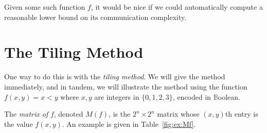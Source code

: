 \documentclass[12pt]{article}
\begin{document}
Given some such function $f$, it would be nice if we could automatically compute
a reasonable lower bound on its communication complexity.

\section{The Tiling Method}

One way to do this is with the \emph{tiling method}.
We will give the method immediately, and in tandem, we will illustrate the method using
the function $f(x, y) = x < y$ where $x, y$ are integers in $\{ 0, 1, 2, 3 \}$, encoded in $\mathbb{B}$oolean.

\begin{definition}[$M(f)$]
The \emph{matrix of }$f$,
	denoted $M(f)$,
		is the $2^n \times 2^n$ matrix whose $(x, y)$th entry
		is the value $f(x, y)$.
An example is given in Table~\ref{fig:ex:Mf}.
\end{definition}
\end{document}
